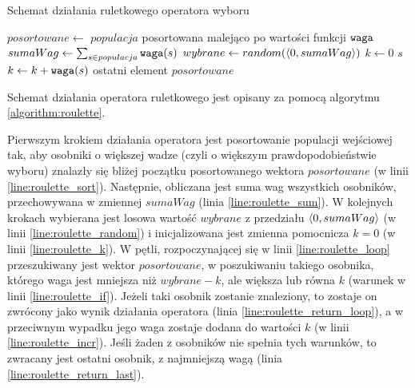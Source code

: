 \documentclass[./FM_mgr.tex]{subfiles}
\begin{document}
	\begin{algorithm}[h]
		\caption{Schemat działania ruletkowego operatora wyboru \label{algorithm:roulette}}
		\begin{algorithmic}[1]
			\Start
			\Var \label{line:roulette_sort} 
			$posortowane \gets$ $populacja$ posortowana malejąco po wartości funkcji $\mathtt{waga}$
			\Var \label{line:roulette_sum} 
			$sumaWag \gets \sum_{s \in populacja} \mathtt{waga}(s)$
			\Var \label{line:roulette_random} 
			$wybrane \gets random(\langle0, sumaWag\rangle)$
			\Var \label{line:roulette_k} 
			$k \gets 0$
			 \label{line:roulette_loop} 
			\label{line:roulette_if} 
			\State \Return $s$ \label{line:roulette_return_loop} 
			\Else
			\State $k \gets k + \mathtt{waga}(s)$ \label{line:roulette_incr} 
			\EndIf
			\EndFor
			\State \Return ostatni element $posortowane$ \label{line:roulette_return_last} 
			\EndOperator
		\end{algorithmic}
	\end{algorithm}
	
	Schemat działania operatora ruletkowego jest opisany za pomocą algorytmu \ref{algorithm:roulette}.
	
	Pierwszym krokiem działania operatora jest posortowanie populacji wejściowej tak, aby osobniki o większej wadze (czyli o większym prawdopodobieństwie wyboru) znalazły się bliżej początku posortowanego wektora $posortowane$ (w linii \ref{line:roulette_sort}).
	Następnie, obliczana jest suma wag wszystkich osobników, przechowywana w zmiennej $sumaWag$ (linia \ref{line:roulette_sum}).
	W kolejnych krokach wybierana jest losowa wartość $wybrane$ z przedziału $\langle0, sumaWag\rangle$ (w linii \ref{line:roulette_random}) i inicjalizowana jest zmienna pomocnicza $k=0$ (w linii \ref{line:roulette_k}).
	W pętli, rozpoczynającej się w linii \ref{line:roulette_loop} przeszukiwany jest wektor $posortowane$, w poszukiwaniu takiego osobnika, którego waga jest mniejsza niż $wybrane-k$, ale większa lub równa $k$ (warunek w linii \ref{line:roulette_if}). 
	Jeżeli taki osobnik zostanie znaleziony, to zostaje on zwrócony jako wynik działania operatora (linia \ref{line:roulette_return_loop}), a w przeciwnym wypadku jego waga zostaje dodana do wartości $k$ (w linii \ref{line:roulette_incr}).
	Jeśli żaden z osobników nie spełnia tych warunków, to zwracany jest ostatni osobnik, z najmniejszą wagą (linia \ref{line:roulette_return_last}).
	
\end{document}
